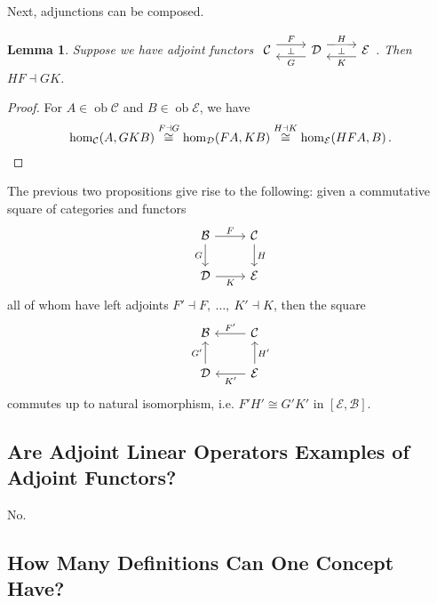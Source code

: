 \documentclass[a4paper,11pt]{article}
\theoremstyle{break_italics}
\newtheorem*{lemma*}{Lemma}
\theoremstyle{break_upright}
\theoremstyle{remark}
\newcommand{\ob}{\operatorname{ob}}
\newcommand{\C}{\mathcal{C}}
\newcommand{\D}{\mathcal{D}}
\begin{document}
Next, adjunctions can be composed.

\begin{lemma*}
Suppose we have adjoint functors $\begin{tikzcd}
	\C & \D & {\mathcal E}
	\arrow["\bot"{description}, draw=none, from=1-1, to=1-2]
	\arrow["F", shift left=2, from=1-1, to=1-2]
	\arrow["G", shift left=2, from=1-2, to=1-1]
	\arrow["H", shift left=2, from=1-2, to=1-3]
	\arrow["\bot"{description}, draw=none, from=1-2, to=1-3]
	\arrow["K", shift left=2, from=1-3, to=1-2]
\end{tikzcd}$. Then $HF \dashv GK$.
\end{lemma*}
\begin{proof}
		For $A \in \ob\C$ and $B \in \ob\mathcal E$, we have
	\[
		\hom_{\C}(A, GKB) \overset{F \dashv G}\cong \hom_\D(FA, KB) \overset{H \dashv K} \cong \hom_{\mathcal E}(HFA, B)\,. \qedhere
	\]
\end{proof}

The previous two propositions give rise to the following: given a commutative square of categories and functors
\[
\begin{tikzcd}
\mathcal B \arrow[r, "F"] \arrow[d, "G"'] & \C \arrow[d, "H"] \\
\D \arrow[r, "K"']                & \mathcal E               
\end{tikzcd}
\]
all of whom have left adjoints $F' \dashv F,\ \dots, \ K' \dashv K$, then the square
\[
\begin{tikzcd}
\mathcal B                & \C \arrow[l, "F'"']                \\
\D \arrow[u, "G'"] & \mathcal E \arrow[u, "H'"'] \arrow[l, "K'"]
\end{tikzcd}
\]
commutes up to natural isomorphism, i.e. $F'H' \cong G'K'$ in $[\mathcal E, \mathcal B]$.










\subsection{Are Adjoint Linear Operators Examples of Adjoint Functors?}

No.










\subsection{How Many Definitions Can One Concept Have?}
\end{document}
